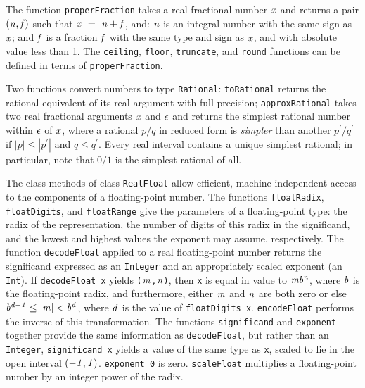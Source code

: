 The function \mbox{\tt properFraction} takes a real
fractional number \mbox{$\it x$} and returns a pair \mbox{$\it (n,f)$} such that \mbox{$\it x\ =\ n+f$}, and:
\mbox{$\it n$} is an integral number with the same sign as \mbox{$\it x$}; and \mbox{$\it f$} is a
fraction \mbox{$\it f$} with the same type and sign as \mbox{$\it x$}, and with absolute
value less than 1.
The \mbox{\tt ceiling}, \mbox{\tt floor}, \mbox{\tt truncate}, and \mbox{\tt round}
functions can be defined in terms of \mbox{\tt properFraction}.

Two functions convert numbers to type \mbox{\tt Rational}:
\mbox{\tt toRational} returns the rational equivalent of
its real argument with full precision;
\mbox{\tt approxRational} takes two real fractional arguments
\mbox{$\it x$} and \mbox{$\it \epsilon$} and returns the simplest rational number within
\mbox{$\it \epsilon$} of \mbox{$\it x$}, where a rational $ p/q $ in reduced form is
{\em simpler} than another $ p^{\prime} / q^{\prime} $ if 
$ |p| \leq |p^{\prime}| $ and $ q \leq q^{\prime} $.
Every real interval contains a unique simplest rational;
in particular, note that $ 0/1 $ is the simplest rational of all.%

The class methods of class \mbox{\tt RealFloat} allow
efficient, machine-independent
access to the components of a floating-point number.
The functions \mbox{\tt floatRadix},
\mbox{\tt floatDigits}, and
\mbox{\tt floatRange} give the parameters of a
floating-point type:  the radix of the representation, the number of
digits of this radix in the significand, and the lowest and highest
values the exponent may assume, respectively.
The function \mbox{\tt decodeFloat}
applied to a real floating-point number returns the significand
expressed as an \mbox{\tt Integer} and an appropriately scaled exponent (an
\mbox{\tt Int}).  If \mbox{\mbox{\tt decodeFloat\ x}} yields \mbox{\mbox{\tt (}\mbox{$\it m$}\mbox{\tt ,}\mbox{$\it n$}\mbox{\tt )}}, then \mbox{\tt x} is
equal in value to \mbox{$\it mb^n$}, where \mbox{$\it b$} is the floating-point radix, and
furthermore, either \mbox{$\it m$} and \mbox{$\it n$} are both zero or else
\mbox{$\it b^{d-1}\leq |m|<b^d$}, where \mbox{$\it d$} is the value of \mbox{\mbox{\tt floatDigits\ x}}.
\mbox{\tt encodeFloat} performs the inverse of this
transformation.  The functions \mbox{\tt significand}
and \mbox{\tt exponent} together provide the same
information as \mbox{\tt decodeFloat},  but rather than an \mbox{\tt Integer},
\mbox{\mbox{\tt significand\ x}} yields a value of the same type as \mbox{\tt x}, scaled to lie
in the open interval \mbox{$\it (-1,1)$}.  \mbox{\mbox{\tt exponent\ 0}} is zero.  \mbox{\tt scaleFloat}
multiplies a floating-point number by an integer power of the radix.

